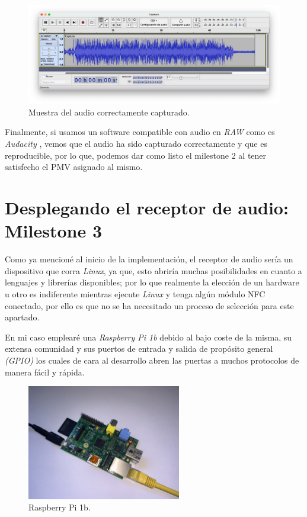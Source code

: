\begin{figure}[htb]
    \centering
    \includegraphics[width=\textwidth]{fotos/muestra_captura_audacity.png}
    \caption{Muestra del audio correctamente capturado.}
\end{figure}

Finalmente, si usamos un software compatible con audio en \emph{RAW} como es
\emph{Audacity} \cite{software-audacity}, vemos que el audio ha sido capturado
correctamente y que es reproducible, por lo que, podemos dar como listo el
milestone 2 al tener satisfecho el PMV asignado al mismo. 


\newpage
\section{Desplegando el receptor de audio: Milestone 3}

Como ya mencioné al inicio de la implementación, el receptor de audio sería un
dispositivo que corra \emph{Linux}, ya que, esto abriría muchas posibilidades en
cuanto a lenguajes y librerías disponibles; por lo que realmente la elección de un
hardware u otro es indiferente mientras ejecute \emph{Linux} y tenga algún
módulo NFC conectado, por ello es que no se ha necesitado un proceso de
selección para este apartado.

En mi caso emplearé una \emph{Raspberry Pi 1b} debido al bajo coste de la misma, su
extensa comunidad y sus puertos de entrada y salida de propósito general
\emph{(GPIO)} \cite{raspberry-gpio} los cuales de cara al desarrollo abren
las puertas a muchos protocolos de manera fácil y rápida. 

\begin{figure}[htb]
    \centering
    \includegraphics[width=0.6\textwidth]{fotos/raspberry_pi_1b.jpeg}
    \caption{Raspberry Pi 1b.}
\end{figure}

